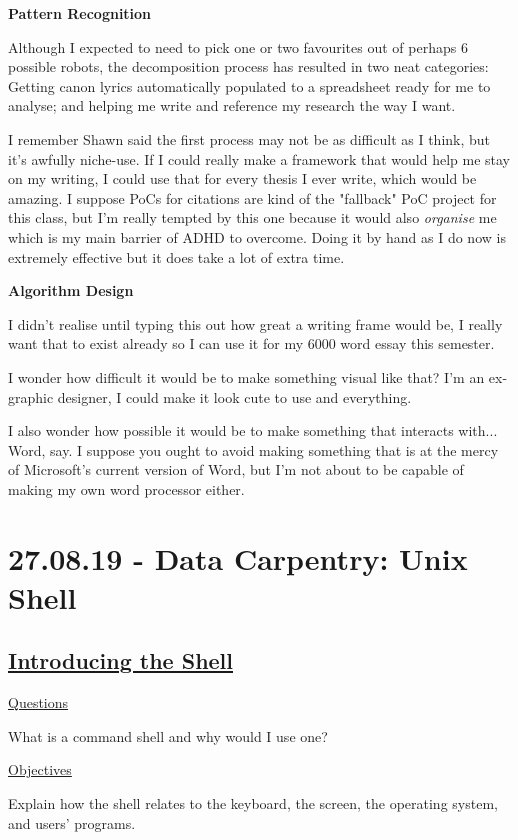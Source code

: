 \documentclass[12pt]{article}
\begin{document}
\textbf{Pattern Recognition}

Although I expected to need to pick one or two favourites out of perhaps 6 possible robots, the decomposition process has resulted in two neat categories: Getting canon lyrics automatically populated to a spreadsheet ready for me to analyse; and helping me write and reference my research the way I want.

I remember Shawn said the first process may not be as difficult as I think, but it's awfully niche-use. If I could really make a framework that would help me stay on my writing, I could use that for every thesis I ever write, which would be amazing. I suppose PoCs for citations are kind of the "fallback" PoC project for this class, but I'm really tempted by this one because it would also \textit{organise} me which is my main barrier of ADHD to overcome. Doing it by hand as I do now is extremely effective but it does take a lot of extra time.

\textbf{Algorithm Design}

I didn't realise until typing this out how great a writing frame would be, I really want that to exist already so I can use it for my 6000 word essay this semester. 

I wonder how difficult it would be to make something visual like that? I'm an ex-graphic designer, I could make it look cute to use and everything. 

I also wonder how possible it would be to make something that interacts with... Word, say. I suppose you ought to avoid making something that is at the mercy of Microsoft's current version of Word, but I'm not about to be capable of making my own word processor either.

\newpage
\section{27.08.19 - Data Carpentry: Unix Shell}

\subsection{\href{http://swcarpentry.github.io/shell-novice/01-intro/index.html}{\textbf{Introducing the Shell}}}

\color{gray}
\underline{Questions}

What is a command shell and why would I use one?

\underline{Objectives}

Explain how the shell relates to the keyboard, the screen, the operating system, and users’ programs.
\end{document}
